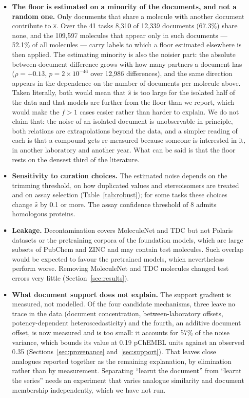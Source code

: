 {\begin{itemize}
\item \textbf{The floor is estimated on a minority of the documents, and not a random one.} Only documents that share a molecule with another document contribute to $\hat s$. Over the 41 tasks 8{,}310 of 12{,}339 documents (67.3\%) share none, and the 109{,}597 molecules that appear only in such documents --- 52.1\% of all molecules --- carry labels to which a floor estimated elsewhere is then applied. The estimating minority is also the noisier part: the absolute between-document difference grows with how many partners a document has ($\rho=+0.13$, $p=2\times10^{-46}$ over 12{,}986 differences), and the same direction appears in the dependence on the number of documents per molecule above. Taken literally, both would mean that $\hat s$ is too large for the isolated half of the data and that models are further from the floor than we report, which would make the $f>1$ cases easier rather than harder to explain. We do not claim that: the noise of an isolated document is unobservable in principle, both relations are extrapolations beyond the data, and a simpler reading of each is that a compound gets re-measured because someone is interested in it, in another laboratory and another year. What can be said is that the floor rests on the densest third of the literature.
\item \textbf{Sensitivity to curation choices.} The estimated noise depends on the trimming threshold, on how duplicated values and stereoisomers are treated and on assay selection (Table~\ref{tab:robust}); for some tasks these choices change $\hat s$ by 0.1 or more. The assay confidence threshold of 8 admits homologous proteins.
\item \textbf{Leakage.} Decontamination covers MoleculeNet and TDC but not Polaris datasets or the pretraining corpora of the foundation models, which are large subsets of PubChem and ZINC and may contain test molecules. Such overlap would be expected to favour the pretrained models, which nevertheless perform worse. Removing MoleculeNet and TDC molecules changed test errors very little (Section~\ref{sec:results}).
\item \textbf{What document support does not explain.} The support gradient is measured, not modelled. Of the four candidate mechanisms, three leave no trace in the data (document concentration, between-laboratory offsets, potency-dependent heteroscedasticity) and the fourth, an additive document offset, is now measured and is too small: it accounts for 57\% of the noise variance, which bounds its value at 0.19 pChEMBL units against an observed 0.35 (Sections~\ref{sec:provenance} and~\ref{sec:support}). That leaves close analogues reported together as the remaining explanation, by elimination rather than by measurement. Separating ``learnt the document'' from ``learnt the series'' needs an experiment that varies analogue similarity and document membership independently, which we have not run.

\end{itemize}}
